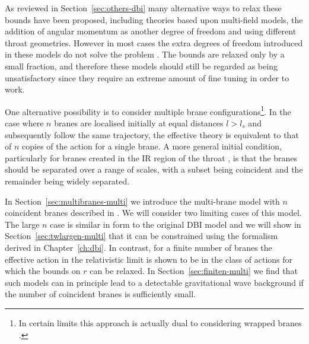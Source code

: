 As reviewed in Section~\ref{sec:others-dbi} many alternative ways to relax these
bounds have been proposed, including
theories based upon multi-field models, the addition of
angular momentum as another degree of freedom and using
different throat geometries. However in most cases
the extra degrees of freedom introduced in these models do not solve the problem
\cite{Alabidi:2008ej}. The 
bounds are relaxed only by a small fraction, and therefore these models should still be 
regarded as being unsatisfactory since they require an extreme amount of fine tuning in order
to work.

One alternative possibility is to consider 
multiple brane configurations\footnote{In certain limits this approach 
is actually dual to considering wrapped branes \cite{Ward:2007gs}.}. 
In the case where  
$n$ branes are localised initially at equal distances $l > l_s$ and 
subsequently follow the same trajectory, 
the effective theory is equivalent to that of $n$ copies of the
action for a single brane. A more general initial condition, particularly
for branes created in the IR region of the throat
\cite{brane13, DeWolfe:2004qx, Kachru:2002gs}, is that
the branes should be separated over a range of scales, 
with a subset being coincident and the remainder being widely separated. 


In Section~\ref{sec:multibranes-multi} we introduce the multi-brane
model with $n$ coincident branes described in . We will
consider two limiting cases of this model. The large $n$ case is similar in
form to the original DBI model and we will show in
Section~\ref{sec:twlargen-multi} that it can be constrained using the
formalism derived in Chapter~\ref{ch:dbi}. In contrast, for a finite number of
branes the effective action in the relativistic limit is shown to be in the
class of actions for which the bounds on $r$ can be relaxed.
In Section~\ref{sec:finiten-multi} we find that
such models 
can in principle lead to a detectable 
gravitational wave background if 
the number of coincident branes is sufficiently small. 





% 
% 
